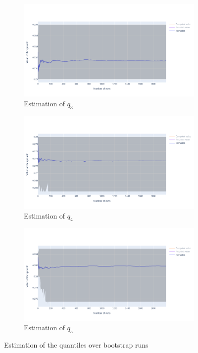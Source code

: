 \documentclass{article}
\begin{document}
\begin{figure}
    \centering
    \begin{subfigure}{.84\textwidth}
        \includegraphics[width=\textwidth]{images/estimation_q3.png}
        \caption{Estimation of $q_3$}
    \end{subfigure}
    \hfill
    \begin{subfigure}{.84\textwidth}
        \includegraphics[width=\textwidth]{images/estimation_q4.png}
        \caption{Estimation of $q_4$}
    \end{subfigure}
    \hfill
    \begin{subfigure}{.84\textwidth}
        \includegraphics[width=\textwidth]{images/estimation_q5.png}
        \caption{Estimation of $q_5$}
    \end{subfigure}
    \caption{Estimation of the quantiles over bootstrap runs}
    \label{fig: estimation of quantiles}
\end{figure}
\end{document}
